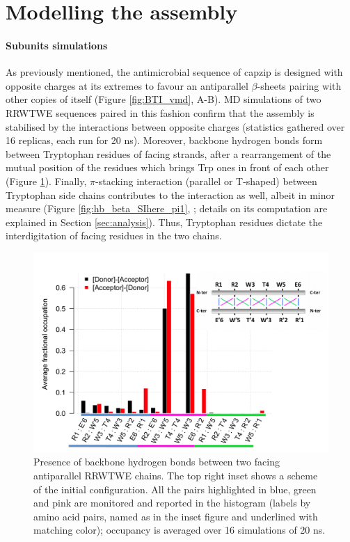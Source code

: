 \section{Modelling the assembly} \label{sec:build}

\paragraph{Subunits simulations} As previously mentioned, the antimicrobial sequence of capzip is designed with opposite charges at its extremes to favour an antiparallel $\beta$-sheets pairing with other copies of itself (Figure \ref{fig:BTI_vmd}, A-B).
%
MD simulations of two RRWTWE sequences paired in this fashion confirm that the assembly is stabilised by the interactions between opposite charges (statistics gathered over 16 replicas, each run for 20 ns).
%
Moreover, backbone hydrogen bonds form between Tryptophan residues of facing strands, after a rearrangement of the mutual position of the residues which brings Trp ones in front of each other (Figure \ref{fig:hb_beta_SIhere_hb}).
%
Finally, $\pi$-stacking interaction (parallel or T-shaped) between Tryptophan side chains contributes to the interaction as well, albeit in minor measure (Figure \ref{fig:hb_beta_SIhere_pi1}, ; details on its computation are explained in Section \ref{sec:analysis}).
%
Thus, Tryptophan residues dictate the interdigitation of facing residues in the two chains.
%
\begin{figure}[t!]
\centering
\includegraphics[width=0.9\linewidth]{3results_capsule/pics/merged_figures_beta_sheet}
\caption[Hydrogen bonds in a RRWTWE $\beta$-sheet]{Presence of backbone hydrogen bonds between two facing antiparallel RRWTWE chains. The top right inset shows a scheme of the initial configuration. All the pairs highlighted in blue, green and pink are monitored and reported in the histogram (labels by amino acid pairs, named as in the inset figure and underlined with matching color); occupancy is averaged over 16 simulations of 20 ns.}
\label{fig:hb_beta_SIhere_hb}
\end{figure}

